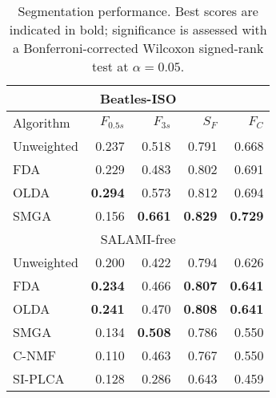\begin{table}
\centering
\caption{Segmentation performance. Best scores are indicated in bold; significance is assessed with a Bonferroni-corrected Wilcoxon
signed-rank test at $\alpha=0.05$.\label{tab:results}}
\begin{tabular}{lrrrr}
\multicolumn{5}{c}{Beatles-ISO}\\
\toprule%
Algorithm   & $F_{0.5s}$ & $F_{3s}$   & $S_F$ & $F_C$\\
\hline
Unweighted  & 0.237             & 0.518             & 0.791             & 0.668\\
FDA         & 0.229             & 0.483             & 0.802             & 0.691\\
OLDA        & \textbf{0.294}    & 0.573             & 0.812             & 0.694\\
\hline
SMGA~\hfill\cite{serra2012unsupervised} 
            & 0.156             & \textbf{0.661}    & \textbf{0.829}    & \textbf{0.729}\\
\toprule%
\multicolumn{5}{c}{SALAMI-free}\\
\toprule%
Unweighted  & 0.200             & 0.422             & 0.794             & 0.626\\
FDA         & \textbf{0.234}    & 0.466             & \textbf{0.807}    & \textbf{0.641}\\
OLDA        & \textbf{0.241}    & 0.470             & \textbf{0.808}    & \textbf{0.641}\\
\hline
SMGA~\hfill\cite{serra2012unsupervised} 
            & 0.134             & \textbf{0.508}    & 0.786             & 0.550\\
C-NMF~\hfill\cite{nieto2013convex}  
            & 0.110             & 0.463             & 0.767             & 0.550\\
SI-PLCA~\hfill\cite{weiss2011unsupervised}  
            & 0.128             & 0.286             & 0.643             & 0.459\\
\bottomrule%
\end{tabular}
\end{table}
